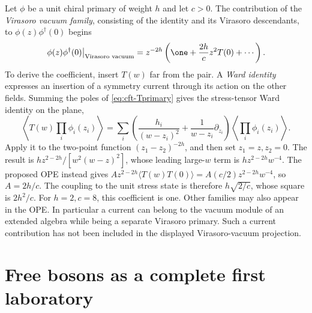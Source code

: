 \begin{example}
Let $\phi$ be a unit chiral primary of weight $h$ and let $c>0$.
The contribution of the \emph{Virasoro vacuum family}, consisting of
the identity and its Virasoro descendants, to
$\phi(z)\phi^\dagger(0)$ begins
\begin{equation}
 \left.\phi(z)\phi^\dagger(0)\right|_{\text{Virasoro vacuum}}
 =z^{-2h}\left(\one+\frac{2h}{c}z^2T(0)+\cdots\right).
 \label{eq:cft-stress-coefficient}
\end{equation}
To derive the coefficient, insert $T(w)$ far from the pair.
A \emph{Ward identity} expresses an insertion of a symmetry current
through its action on the other fields. Summing the poles of
\eqref{eq:cft-Tprimary} gives the stress-tensor Ward identity on the
plane,
\[
 \left\langle T(w)\prod_i\phi_i(z_i)\right\rangle
 =\sum_i\left(\frac{h_i}{(w-z_i)^2}
       +\frac{1}{w-z_i}\partial_{z_i}\right)
       \left\langle\prod_i\phi_i(z_i)\right\rangle.
\]
Apply it to the two-point function $(z_1-z_2)^{-2h}$, and then set
$z_1=z,z_2=0$. The result is
$h z^{2-2h}/[w^2(w-z)^2]$, whose leading large-$w$ term is
$h z^{2-2h}w^{-4}$.
The proposed OPE instead gives
$A z^{2-2h}\langle T(w)T(0)\rangle
=A(c/2)z^{2-2h}w^{-4}$, so $A=2h/c$.
The coupling to the unit stress state is therefore
$h\sqrt{2/c}$, whose square is $2h^2/c$.
For $h=2,c=8$, this coefficient is one.
Other families may also appear in the OPE. In particular a current
can belong to the vacuum module of an extended algebra while being
a separate Virasoro primary. Such a current contribution has not
been included in the displayed Virasoro-vacuum projection.
\end{example}

\section{Free bosons as a complete first laboratory}

